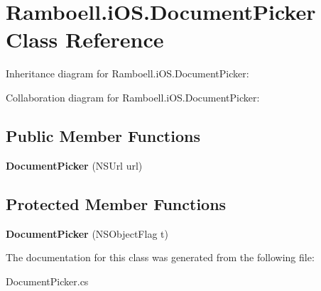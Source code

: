 \hypertarget{class_ramboell_1_1i_o_s_1_1_document_picker}{}\section{Ramboell.\+i\+O\+S.\+Document\+Picker Class Reference}
\label{class_ramboell_1_1i_o_s_1_1_document_picker}


Inheritance diagram for Ramboell.\+i\+O\+S.\+Document\+Picker\+:


Collaboration diagram for Ramboell.\+i\+O\+S.\+Document\+Picker\+:
\subsection*{Public Member Functions}
\begin{DoxyCompactItemize}
\item 
\mbox{\label{class_ramboell_1_1i_o_s_1_1_document_picker_acb7daeca0628af8cf6d9b4d52ae9adbb}} 
{\bfseries Document\+Picker} (N\+S\+Url url)
\end{DoxyCompactItemize}
\subsection*{Protected Member Functions}
\begin{DoxyCompactItemize}
\item 
\mbox{\label{class_ramboell_1_1i_o_s_1_1_document_picker_a18b38376b5a7fa094463f62b801ac9b3}} 
{\bfseries Document\+Picker} (N\+S\+Object\+Flag t)
\end{DoxyCompactItemize}


The documentation for this class was generated from the following file\+:\begin{DoxyCompactItemize}
\item 
Document\+Picker.\+cs\end{DoxyCompactItemize}

